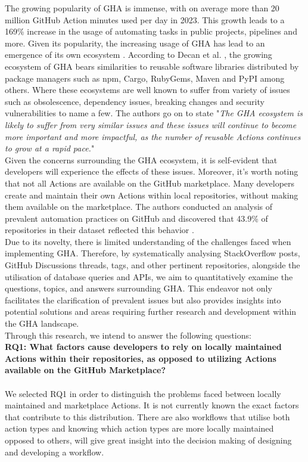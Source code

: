\documentclass[conference]{IEEEtran}
\begin{document}
    The growing popularity of GHA is immense, with on average more than 20 million GitHub Action minutes used per day in 2023. This growth leads to a 169\% increase in the usage of automating tasks in public projects,  pipelines and more\cite{github2023octoverse}. Given its popularity,  the increasing usage of GHA has lead to an emergence of its own ecosystem \cite{decan2022use}.  According to Decan et al. \cite{decan2022use}, the growing ecosystem of GHA bears similarities to reusable software libraries distributed by package managers such as npm, Cargo, RubyGems, Maven and PyPI among others. Where these ecosystems are well known to suffer from variety of issues such as obsolescence, dependency issues, breaking changes and security vulnerabilities to name a few\cite{decan2022use}. The authors go on to state "\textit{The GHA ecosystem is likely to suffer from very similar issues and these issues will continue to become more important and more impactful, as the number of reusable Actions continues to grow at a rapid pace.}"\\

    Given the concerns surrounding the GHA ecosystem, it is self-evident that developers will experience the effects of these issues.  Moreover, it's worth noting that not all Actions are available on the GitHub marketplace. Many developers create and maintain their own Actions within local repositories, without making them available on the marketplace. The authors  conducted an analysis of prevalent automation practices on GitHub and discovered that 43.9\% of repositories in their dataset reflected this behavior \cite{decan2022use}.\\

    Due to its novelty, there is limited understanding of the challenges faced when implementing GHA.  
    Therefore,  by systematically analysing StackOverflow posts, GitHub Discussions threads, tags, and other pertinent repositories, alongside the utilisation of database queries and APIs, we aim to quantitatively examine the questions, topics, and answers surrounding GHA. This endeavor not only facilitates the clarification of prevalent issues but also provides insights into potential solutions and areas requiring further research and development within the GHA landscape.\\

    Through this research, we intend to answer the following questions:\\


    \textbf{RQ1: What factors cause developers to rely on locally maintained Actions within their repositories, as opposed to utilizing Actions available on the GitHub Marketplace?}\\\\
    We selected RQ1 in order to distinguish the problems faced between locally maintained and marketplace Actions. It is not currently known the exact factors that contribute to this distribution. There are also workflows that utilise both action types and knowing which action types are more locally maintained opposed to others, will give great insight into the decision making of designing and developing a workflow. \\
\end{document}
